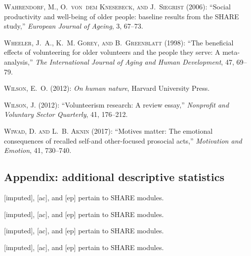 \documentclass[10pt, letterpaper]{article}
\begin{document}
\begin{spacing}{1.4}
\begin{thebibliography}{91}
\textsc{Wahrendorf, M., O.~von~dem Knesebeck, and J.~Siegrist} (2006):
  \enquote{Social productivity and well-being of older people: baseline results
  from the SHARE study,} \emph{European Journal of Ageing}, 3, 67--73.

\textsc{Wheeler, J.~A., K.~M. Gorey, and B.~Greenblatt} (1998): \enquote{The
  beneficial effects of volunteering for older volunteers and the people they
  serve: A meta-analysis,} \emph{The International Journal of Aging and Human
  Development}, 47, 69--79.

\textsc{Wilson, E.~O.} (2012{}): \emph{On human nature}, Harvard
  University Press.

\textsc{Wilson, J.} (2012{}): \enquote{Volunteerism research: A
  review essay,} \emph{Nonprofit and Voluntary Sector Quarterly}, 41, 176--212.

\textsc{Wiwad, D. and L.~B. Aknin} (2017): \enquote{Motives matter: The
  emotional consequences of recalled self-and other-focused prosocial acts,}
  \emph{Motivation and Emotion}, 41, 730--740.

\end{thebibliography}



\begin{spacing}{.9}

\section*{Appendix: additional descriptive statistics}

 
{\footnotesize [imputed], [ac], and [ep] pertain to SHARE modules.}
 
{\footnotesize [imputed], [ac], and [ep] pertain to SHARE modules.}
 
{\footnotesize [imputed], [ac], and [ep] pertain to SHARE modules.}
 
{\footnotesize [imputed], [ac], and [ep] pertain to SHARE modules.}

\vspace{.2in}


\end{spacing}
\end{spacing}
\end{document}
